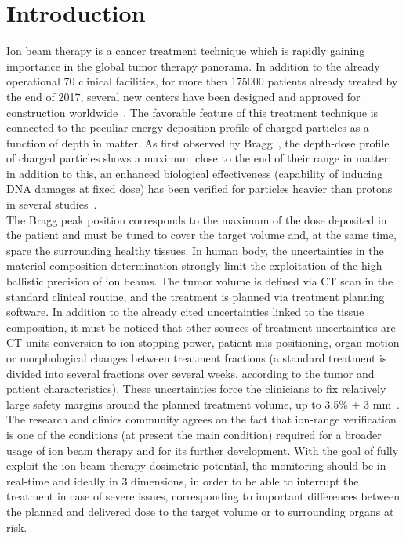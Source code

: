 \section{Introduction}\label{section::Intro}
Ion beam therapy is a cancer treatment technique which is rapidly gaining importance in the global tumor therapy panorama. In addition to the already operational 70 clinical facilities, for more then 175000 patients already treated by the end of 2017, several new centers have been designed and approved for construction worldwide~\cite{PTCOG_stats}. The favorable feature of this treatment technique is connected to the peculiar energy deposition profile of charged particles as a function of depth in matter. As first observed by Bragg~\cite{Bragg_main}, the depth-dose profile of charged particles shows a maximum close to the end of their range in matter; in addition to this, an enhanced biological effectiveness (capability of inducing DNA damages at fixed dose) has been verified for particles heavier than protons in several studies~\cite{RBE_Elsasser, RBE_Weyrather}.\\
The Bragg peak position corresponds to the maximum of the dose deposited in the patient and must be tuned to cover the target volume and, at the same time, spare the surrounding healthy tissues. In human body, the uncertainties in the material composition determination strongly limit the exploitation of the high ballistic precision of ion beams. The tumor volume is defined via CT scan in the standard clinical routine, and the treatment is planned via treatment planning software. In addition to the already cited uncertainties linked to the tissue composition, it must be noticed that other sources of treatment uncertainties are CT units conversion to ion stopping power, patient mis-positioning, organ motion or morphological changes between treatment fractions (a standard treatment is divided into several fractions over several weeks, according to the tumor and patient characteristics). These uncertainties force the clinicians to fix relatively large safety margins around the planned treatment volume, up to 3.5\% + 3 mm~\cite{Paganetti:2012aa}. The research and clinics community agrees on the fact that ion-range verification is one of the conditions (at present the main condition) required for a broader usage of ion beam therapy and for its further development. With the goal of fully exploit the ion beam therapy dosimetric potential, the monitoring should be in real-time and ideally in 3 dimensions, in order to be able to interrupt the treatment in case of severe issues, corresponding to important differences between the planned and delivered dose to the target volume or to surrounding organs at risk.\\
